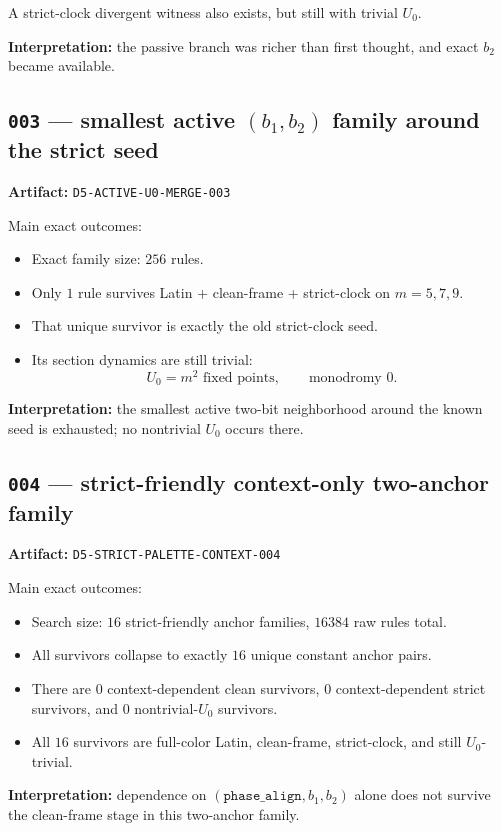 \documentclass[11pt]{article}
\begin{document}
A strict-clock divergent witness also exists, but still with trivial $U_0$.

\textbf{Interpretation:} the passive branch was richer than first thought, and exact $b_2$ became available.

\subsection*{\texttt{003} --- smallest active $(b_1,b_2)$ family around the strict seed}

\textbf{Artifact:} \texttt{D5-ACTIVE-U0-MERGE-003}

Main exact outcomes:
\begin{itemize}
    \item Exact family size: $256$ rules.
    \item Only $1$ rule survives Latin + clean-frame + strict-clock on $m=5,7,9$.
    \item That unique survivor is exactly the old strict-clock seed.
    \item Its section dynamics are still trivial:
    \[
    U_0 = m^2 \text{ fixed points}, \qquad \text{monodromy } 0.
    \]
\end{itemize}

\textbf{Interpretation:} the smallest active two-bit neighborhood around the known seed is exhausted; no nontrivial $U_0$ occurs there.

\subsection*{\texttt{004} --- strict-friendly context-only two-anchor family}

\textbf{Artifact:} \texttt{D5-STRICT-PALETTE-CONTEXT-004}

Main exact outcomes:
\begin{itemize}
    \item Search size: $16$ strict-friendly anchor families, $16384$ raw rules total.
    \item All survivors collapse to exactly $16$ unique constant anchor pairs.
    \item There are $0$ context-dependent clean survivors, $0$ context-dependent strict survivors, and $0$ nontrivial-$U_0$ survivors.
    \item All $16$ survivors are full-color Latin, clean-frame, strict-clock, and still $U_0$-trivial.
\end{itemize}

\textbf{Interpretation:} dependence on $(\texttt{phase\_align},b_1,b_2)$ alone does not survive the clean-frame stage in this two-anchor family.
\end{document}

